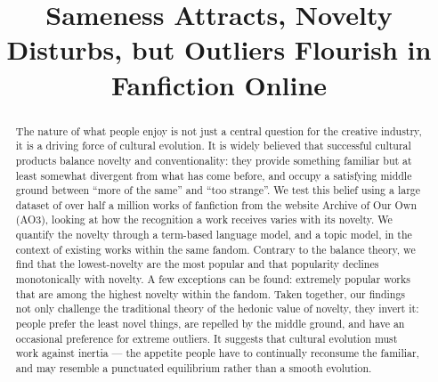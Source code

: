\documentclass[letterpaper]{article} %
\begin{document}
\title{Sameness Attracts, Novelty Disturbs, but Outliers Flourish in Fanfiction Online}

\maketitle
\begin{abstract}
The nature of what people enjoy is not just a central question for the creative industry, it is a driving force of cultural evolution. It is widely believed that successful cultural products balance novelty and conventionality: they provide something familiar but at least somewhat divergent from what has come before, and occupy a satisfying middle ground between ``more of the same'' and ``too strange''. We test this belief using a large dataset of over half a million works of fanfiction from the website Archive of Our Own (AO3), looking at how the recognition a work receives varies with its novelty. We quantify the novelty through a term-based language model, and a topic model, in the context of existing works within the same fandom. Contrary to the balance theory, we find that the lowest-novelty are the most popular and that popularity declines monotonically with novelty. A few exceptions can be found: extremely popular works that are among the  highest novelty within the fandom. Taken together, our findings not only challenge the traditional theory of the hedonic value of novelty, they invert it: people prefer the least novel things, are repelled by the middle ground, and have an occasional preference for extreme outliers. It suggests that cultural evolution must work against inertia --- the appetite people have to continually reconsume the familiar, and may resemble a punctuated equilibrium rather than a smooth evolution.
\end{abstract}
\end{document}

